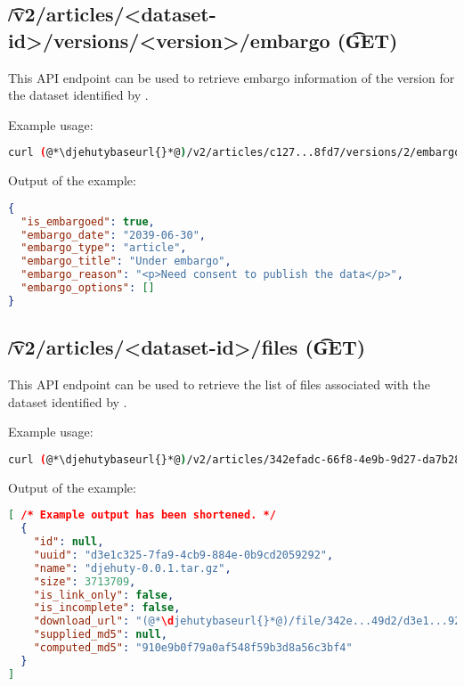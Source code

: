 \subsection{\t{/v2/articles/<dataset-id>/versions/<version>/embargo} (\t{GET})}

  This API endpoint can be used to retrieve embargo information of the version
   for the dataset identified by .

  Example usage:
\begin{lstlisting}[language=bash]
curl (@*\djehutybaseurl{}*@)/v2/articles/c127...8fd7/versions/2/embargo | jq
\end{lstlisting}

  Output of the example:
\begin{lstlisting}[language=JSON]
{
  "is_embargoed": true,
  "embargo_date": "2039-06-30",
  "embargo_type": "article",
  "embargo_title": "Under embargo",
  "embargo_reason": "<p>Need consent to publish the data</p>",
  "embargo_options": []
}
\end{lstlisting}


\subsection{\t{/v2/articles/<dataset-id>/files} (\t{GET})}

  This API endpoint can be used to retrieve the list of files associated with
  the dataset identified by .

  Example usage:
\begin{lstlisting}[language=bash]
curl (@*\djehutybaseurl{}*@)/v2/articles/342efadc-66f8-4e9b-9d27-da7b28b849d2/files
\end{lstlisting}

  Output of the example:
\begin{lstlisting}[language=JSON]
[ /* Example output has been shortened. */
  {
    "id": null,
    "uuid": "d3e1c325-7fa9-4cb9-884e-0b9cd2059292",
    "name": "djehuty-0.0.1.tar.gz",
    "size": 3713709,
    "is_link_only": false,
    "is_incomplete": false,
    "download_url": "(@*\djehutybaseurl{}*@)/file/342e...49d2/d3e1...9292",
    "supplied_md5": null,
    "computed_md5": "910e9b0f79a0af548f59b3d8a56c3bf4"
  }
]
\end{lstlisting}

